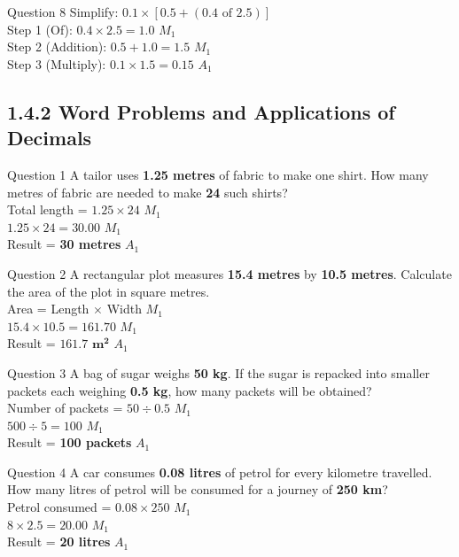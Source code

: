 \documentclass[12pt, a4paper, oneside]{article}
\begin{document}
\begin{solvingbox}{Question 8}
Simplify: $0.1 \times [0.5 + (0.4 \text{ of } 2.5)]$ \\
Step 1 (Of): $0.4 \times 2.5 = 1.0$ \hfill $M_1$ \\
Step 2 (Addition): $0.5 + 1.0 = 1.5$ \hfill $M_1$ \\
Step 3 (Multiply): $0.1 \times 1.5 = \mathbf{0.15}$ \hfill $A_1$
\end{solvingbox}

\subsection*{1.4.2 Word Problems and Applications of Decimals}

\begin{solvingbox}{Question 1}
A tailor uses \textbf{1.25 metres} of fabric to make one shirt. How many metres of fabric are needed to make \textbf{24} such shirts? \\
Total length = $1.25 \times 24$ \hfill $M_1$ \\
$1.25 \times 24 = 30.00$ \hfill $M_1$ \\
Result = \textbf{30 metres} \hfill $A_1$
\end{solvingbox}

\begin{solvingbox}{Question 2}
A rectangular plot measures \textbf{15.4 metres} by \textbf{10.5 metres}. Calculate the area of the plot in square metres. \\
Area = Length $\times$ Width \hfill $M_1$ \\
$15.4 \times 10.5 = 161.70$ \hfill $M_1$ \\
Result = $\mathbf{161.7\text{ m}^2}$ \hfill $A_1$
\end{solvingbox}

\begin{solvingbox}{Question 3}
A bag of sugar weighs \textbf{50 kg}. If the sugar is repacked into smaller packets each weighing \textbf{0.5 kg}, how many packets will be obtained? \\
Number of packets = $50 \div 0.5$ \hfill $M_1$ \\
$500 \div 5 = 100$ \hfill $M_1$ \\
Result = \textbf{100 packets} \hfill $A_1$
\end{solvingbox}

\begin{solvingbox}{Question 4}
A car consumes \textbf{0.08 litres} of petrol for every kilometre travelled. How many litres of petrol will be consumed for a journey of \textbf{250 km}? \\
Petrol consumed = $0.08 \times 250$ \hfill $M_1$ \\
$8 \times 2.5 = 20.00$ \hfill $M_1$ \\
Result = \textbf{20 litres} \hfill $A_1$
\end{solvingbox}
\end{document}
